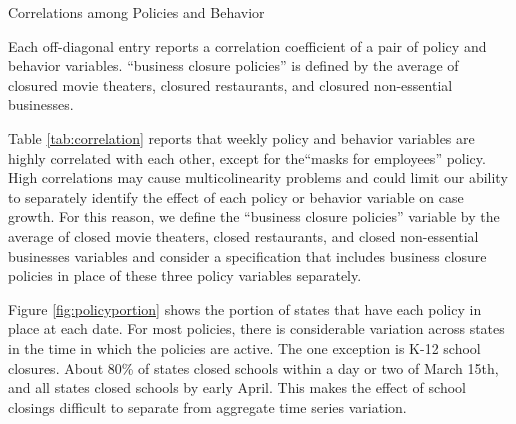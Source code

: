 \documentclass[3p, longtitle]{elsarticle}
\theoremstyle{definition}
\begin{document}
\begin{table}\caption{Correlations among Policies and Behavior \label{tab:correlation}}\vspace{-0.2cm}
  \begin{minipage}{\linewidth}
    \resizebox{\linewidth}{!}{
      
    }\smallskip
       \begin{flushleft}
         \scriptsize
         Each off-diagonal entry reports a correlation coefficient of
         a pair of policy and behavior variables. ``business closure policies'' is defined by the average of  closured movie theaters, closured restaurants, and closured non-essential businesses.
       \end{flushleft}
  \end{minipage}
\end{table}

Table \ref{tab:correlation} reports that weekly policy and behavior
variables are highly correlated with each other, except for the``masks
for employees'' policy.  High correlations may cause multicolinearity
problems and could limit our ability to separately identify the
effect of each policy or behavior variable on case growth.
For this reason, we define  the ``business closure policies'' variable by the average of closed movie theaters, closed  restaurants, and closed non-essential businesses variables and consider a specification that includes business closure policies   in place of these three policy variables separately.

Figure \ref{fig:policyportion} shows the portion of states that have
each policy in place at each date. For most policies, there is
considerable variation across states in the time in which the policies
are active. The one exception is K-12 school closures. About 80\% of
states closed schools within a day or two of March 15th, and all
states closed schools by early April. This makes the effect of school
closings difficult to separate from aggregate time series variation.
\end{document}

